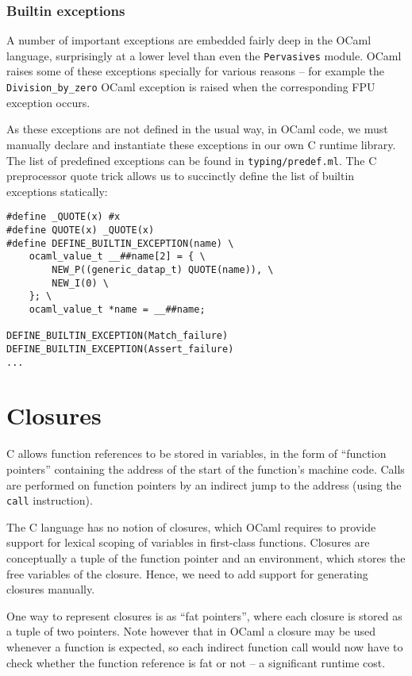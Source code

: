 \documentclass[12pt,a4paper,twoside,openright]{report}
\begin{document}
\subsubsection{Builtin exceptions}\label{builtin-exceptions}

A number of important exceptions are embedded fairly deep in the OCaml
language, surprisingly at a lower level than even the \lstinline!Pervasives!
module. OCaml raises some of these exceptions specially for various reasons --
for example the \lstinline!Division_by_zero! OCaml exception is raised when the
corresponding FPU exception occurs.

As these exceptions are not defined in the usual way, in OCaml code, we must
manually declare and instantiate these exceptions in our own C runtime library.
The list of predefined exceptions can be found in \lstinline!typing/predef.ml!.
The C preprocessor quote trick allows us to succinctly define the list of
builtin exceptions statically:

\begin{lstlisting}
#define _QUOTE(x) #x
#define QUOTE(x) _QUOTE(x)
#define DEFINE_BUILTIN_EXCEPTION(name) \
    ocaml_value_t __##name[2] = { \
        NEW_P((generic_datap_t) QUOTE(name)), \
        NEW_I(0) \
    }; \
    ocaml_value_t *name = __##name;

DEFINE_BUILTIN_EXCEPTION(Match_failure)
DEFINE_BUILTIN_EXCEPTION(Assert_failure)
...
\end{lstlisting}

\section{Closures}\label{closures}

C allows function references to be stored in variables, in the form of
``function pointers'' containing the address of the start of the function's
machine code. Calls are performed on function pointers by an indirect jump to
the address (using the \lstinline!call! instruction).

The C language has no notion of closures, which OCaml requires to provide
support for lexical scoping of variables in first-class functions. Closures are
conceptually a tuple of the function pointer and an environment, which stores
the free variables of the closure. Hence, we need to add support for generating
closures manually.

One way to represent closures is as ``fat pointers'', where each closure is
stored as a tuple of two pointers. Note however that in OCaml a closure may be
used whenever a function is expected, so each indirect function call would now
have to check whether the function reference is fat or not -- a significant
runtime cost.
\end{document}
